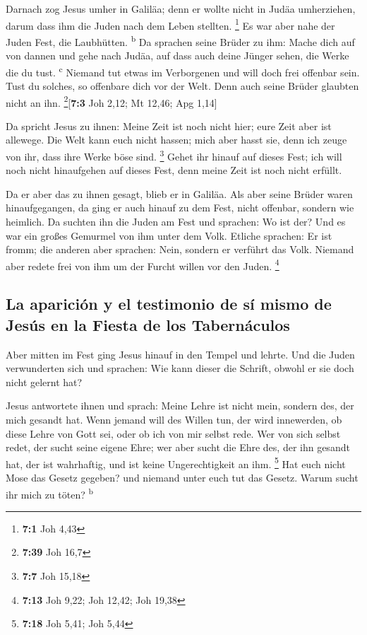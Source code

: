  Darnach zog Jesus umher in Galiläa; denn er wollte nicht
in Judäa umherziehen, darum dass ihm die Juden nach dem Leben stellten.
\footnote{\textbf{7:1} Joh 4,43}  Es war aber nahe der
Juden Fest, die Laubhütten. \textsuperscript{b}  Da
sprachen seine Brüder zu ihm: Mache dich auf von dannen und gehe nach
Judäa, auf dass auch deine Jünger sehen, die Werke die du tust.
\textsuperscript{c}  Niemand tut etwas im Verborgenen und
will doch frei offenbar sein. Tust du solches, so offenbare dich vor der
Welt.  Denn auch seine Brüder glaubten nicht an ihn.
\footnote{\textbf{7:39} Joh 16,7}{[}\textbf{7:3} Joh 2,12; Mt 12,46; Apg
1,14{]}

 Da spricht Jesus zu ihnen: Meine Zeit ist noch nicht
hier; eure Zeit aber ist allewege.  Die Welt kann euch
nicht hassen; mich aber hasst sie, denn ich zeuge von ihr, dass ihre
Werke böse sind. \footnote{\textbf{7:7} Joh 15,18}  Gehet
ihr hinauf auf dieses Fest; ich will noch nicht hinaufgehen auf dieses
Fest, denn meine Zeit ist noch nicht erfüllt.

 Da er aber das zu ihnen gesagt, blieb er in Galiläa.
 Als aber seine Brüder waren hinaufgegangen, da ging er
auch hinauf zu dem Fest, nicht offenbar, sondern wie heimlich.
 Da suchten ihn die Juden am Fest und sprachen: Wo ist
der?  Und es war ein großes Gemurmel von ihm unter dem
Volk. Etliche sprachen: Er ist fromm; die anderen aber sprachen: Nein,
sondern er verführt das Volk.  Niemand aber redete frei
von ihm um der Furcht willen vor den Juden. \footnote{\textbf{7:13} Joh
  9,22; Joh 12,42; Joh 19,38}

\hypertarget{la-apariciuxf3n-y-el-testimonio-de-suxed-mismo-de-jesuxfas-en-la-fiesta-de-los-tabernuxe1culos}{%
\subsection{La aparición y el testimonio de sí mismo de Jesús en la
Fiesta de los
Tabernáculos}\label{la-apariciuxf3n-y-el-testimonio-de-suxed-mismo-de-jesuxfas-en-la-fiesta-de-los-tabernuxe1culos}}

 Aber mitten im Fest ging Jesus hinauf in den Tempel und
lehrte.  Und die Juden verwunderten sich und sprachen:
Wie kann dieser die Schrift, obwohl er sie doch nicht gelernt hat?

 Jesus antwortete ihnen und sprach: Meine Lehre ist nicht
mein, sondern des, der mich gesandt hat.  Wenn jemand
will des Willen tun, der wird innewerden, ob diese Lehre von Gott sei,
oder ob ich von mir selbst rede.  Wer von sich selbst
redet, der sucht seine eigene Ehre; wer aber sucht die Ehre des, der ihn
gesandt hat, der ist wahrhaftig, und ist keine Ungerechtigkeit an ihm.
\footnote{\textbf{7:18} Joh 5,41; Joh 5,44}  Hat euch
nicht Mose das Gesetz gegeben? und niemand unter euch tut das Gesetz.
Warum sucht ihr mich zu töten? \textsuperscript{b}

